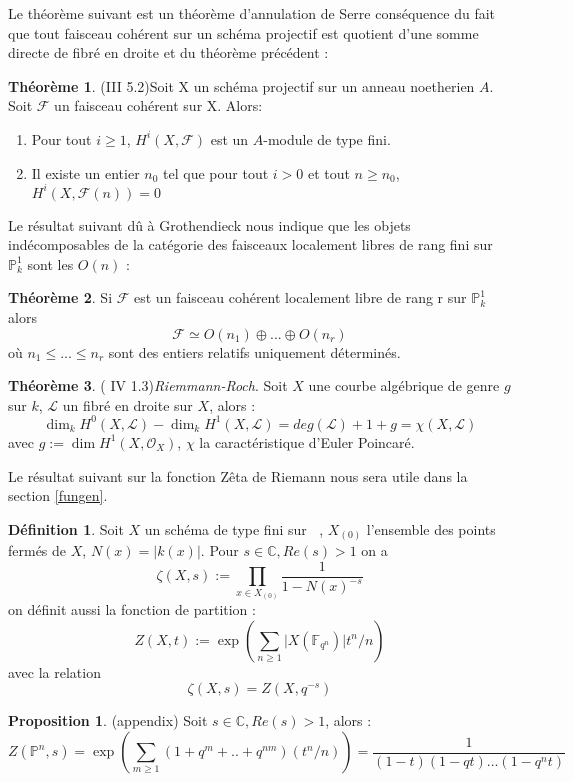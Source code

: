 \documentclass[12pt]{article}
\DeclareMathOperator{\Fq}{\mathbb{F}_{q}}
\theoremstyle{definition}
\newtheorem{theo}{Théorème}[section]
\newtheorem{Prop}{Proposition}[section]
\newtheorem{Def}{Définition}[section]
\begin{document}
Le théorème suivant est un théorème d'annulation de Serre conséquence du fait que tout faisceau cohérent sur un schéma projectif est quotient d'une somme directe de fibré en droite et du théorème précédent :
\begin{theo}\label{Serrev}\cite{Hart} (III 5.2)Soit X un schéma projectif sur un anneau noetherien $A$. Soit $\mathcal{F}$ un faisceau cohérent sur X. Alors: \begin{enumerate}
\item Pour tout $i\geqslant 1$, $H^i(X,\mathcal{F})$ est un $A$-module de type fini.
\item Il existe un entier $n_0$ tel que pour tout $i>0$ et tout $n\geqslant n_0$, $H^i(X,\mathcal{F}(n))=0$
\end{enumerate}  \end{theo}
Le résultat suivant dû à Grothendieck \cite{Groth} nous indique que les objets indécomposables de la catégorie des faisceaux localement libres de rang fini sur $\mathbb{P}^{1}_{k}$ sont les $O(n)$ : 
\begin{theo}\label{groth} Si $\mathcal{F}$ est un faisceau cohérent localement libre de rang r sur $\mathbb{P}^{1}_{k}$ alors $$\mathcal{F}\simeq O(n_{1})\oplus ...\oplus O(n_{r}) $$ où $n_{1}\leq ...\leq n_{r}$ sont des entiers relatifs uniquement déterminés.
\end{theo}
\begin{theo}\label{Riemroch} (\cite{Hart} IV 1.3)\textit{Riemmann-Roch}. Soit $X$ une courbe algébrique de genre $g$ sur $k$,  $\mathcal{L}$ un fibré en droite sur $X$, alors :  $$\dim_k H^{0}(X,\mathcal{L})-\dim_k H^{1}(X,\mathcal{L})=deg(\mathcal{L})+1+g=\chi(X,\mathcal{L})$$ avec $g:=\dim H^{1}(X,\mathcal{O}_X)$, $\chi$ la caractéristique d'Euler Poincaré.\end{theo}
Le résultat suivant sur la fonction Zêta de Riemann nous sera utile dans la section \ref{fungen}. 
\begin{Def} Soit $X$ un schéma de type fini sur $\Fq$, $X_{(0)}$ l'ensemble des points fermés de $X$, $N(x)=\vert k(x)\vert$. Pour $s\in\mathbb{C},Re(s)>1$ on a $$\zeta(X,s):= \underset{x\in X_{(0)}}{\prod}\frac{1}{1-N(x)^{-s}}$$ on définit aussi la fonction de partition : $$Z(X,t):=\exp(\sum_{n\geqslant 1}\vert X(\mathbb{F}_{q^n})\vert t^n/n)$$ avec la relation $$\zeta(X,s)=Z(X,q^{-s})$$\end{Def}
\begin{Prop}\label{zeta}\cite{Hart}(appendix) Soit $s\in\mathbb{C},Re(s)>1$, alors : $$Z(\mathbb{P}^{n}_{\Fq},s)=\exp(\sum_{m\geqslant 1}(1+q^m+..+q^{nm})(t^n/n))=\frac{1}{(1-t)(1-qt)...(1-q^nt)}$$\end{Prop}
\end{document}
